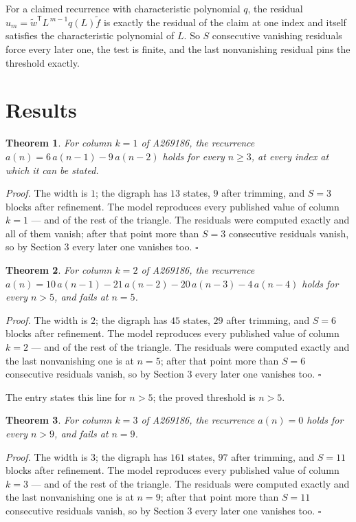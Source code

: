 \documentclass[11pt]{article}
\newtheorem{theorem}{Theorem}
\theoremstyle{definition}
\begin{document}
For a claimed recurrence with characteristic polynomial $q$, the residual $u_m = \tilde w^{\mathsf T}L^{\,m-1}q(L)\tilde f$ is exactly the residual of the claim at one index and itself satisfies the characteristic polynomial of $L$. So $S$ consecutive vanishing residuals force every later one, the test is finite, and the last nonvanishing residual pins the threshold exactly.

\section{Results}

\begin{theorem} For column $k = 1$ of A269186, the recurrence $a(n) = 6\,a(n-1) - 9\,a(n-2)$ holds for every $n \ge 3$, at every index at which it can be stated.\end{theorem}

{\itshape Proof.} The width is $1$; the digraph has $13$ states, $9$ after trimming, and $S = 3$ blocks after refinement. The model reproduces every published value of column $k = 1$ --- and of the rest of the triangle. The residuals were computed exactly and all of them vanish; after that point more than $S = 3$ consecutive residuals vanish, so by Section 3 every later one vanishes too. $\square$

\begin{theorem} For column $k = 2$ of A269186, the recurrence $a(n) = 10\,a(n-1) - 21\,a(n-2) - 20\,a(n-3) - 4\,a(n-4)$ holds for every $n > 5$, and fails at $n = 5$.\end{theorem}

{\itshape Proof.} The width is $2$; the digraph has $45$ states, $29$ after trimming, and $S = 6$ blocks after refinement. The model reproduces every published value of column $k = 2$ --- and of the rest of the triangle. The residuals were computed exactly and the last nonvanishing one is at $n = 5$; after that point more than $S = 6$ consecutive residuals vanish, so by Section 3 every later one vanishes too. $\square$

The entry states this line for $n > 5$; the proved threshold is $n > 5$.

\begin{theorem} For column $k = 3$ of A269186, the recurrence $a(n) = 0$ holds for every $n > 9$, and fails at $n = 9$.\end{theorem}

{\itshape Proof.} The width is $3$; the digraph has $161$ states, $97$ after trimming, and $S = 11$ blocks after refinement. The model reproduces every published value of column $k = 3$ --- and of the rest of the triangle. The residuals were computed exactly and the last nonvanishing one is at $n = 9$; after that point more than $S = 11$ consecutive residuals vanish, so by Section 3 every later one vanishes too. $\square$
\end{document}

